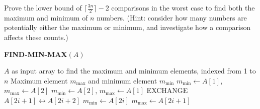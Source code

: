 \noindent {} 
Prove the lower bound of $\lceil \frac{3n}{2} \rceil - 2$ comparisons in the worst case to find both the maximum and minimum of $n$ numbers. (Hint: consider how many numbers are potentially either the maximum or minimum, and investigate how a comparison affects these counts.) 
\begin{algorithm}[h]
\caption{\textbf{FIND-MIN-MAX}$(A)$} \label{alg:min-max}
\begin{algorithmic}[1]
\Require $A$ as input array to find the maximum and minimum elements, indexed from 1 to $n$
\Ensure Maximum element $m_{\max}$ and minimum element $m_{\min}$
    \State $m_{\min} \leftarrow A[1]$, $m_{\max} \leftarrow A[2]$  
\Else
    \State $m_{\min} \leftarrow A[2]$, $m_{\max} \leftarrow A[1]$
\EndIf
{}  
        \State EXCHANGE $A[2i+1] \leftrightarrow A[2i+2]$
    \EndIf
        \State $m_{\min} \leftarrow A[2i]$
    \EndIf
        \State $m_{\max} \leftarrow A[2i+1]$
    \EndIf
\EndFor
\end{algorithmic}
\end{algorithm}

\noindent {}
